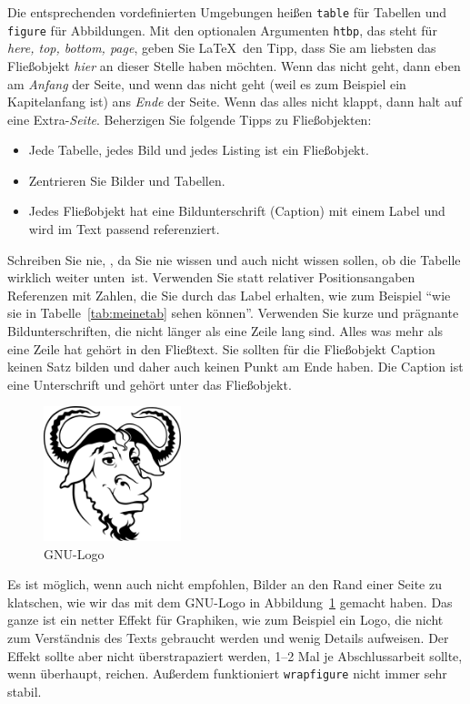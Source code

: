 \documentclass[11pt,a4paper]{report}
\begin{document}
Die entsprechenden vordefinierten Umgebungen heißen 
\verb|table| für Tabellen und \verb|figure| für Abbildungen. 
Mit den optionalen Argumenten \verb|htbp|, das steht für
\textit{here, top, bottom, page}, geben Sie \LaTeX\ den 
Tipp, dass Sie am liebsten das Fließobjekt \textit{hier}
an dieser Stelle haben möchten. Wenn das nicht geht, dann
eben am \textit{Anfang} der Seite, und wenn das nicht geht (weil es
zum Beispiel ein Kapitelanfang ist) ans \textit{Ende} der Seite. 
Wenn das alles nicht klappt, dann halt auf eine Extra-\textit{Seite}.
Beherzigen Sie folgende Tipps zu Fließobjekten:
\begin{itemize}
\item Jede Tabelle, jedes Bild und jedes Listing ist ein Fließobjekt.
\item Zentrieren Sie Bilder und Tabellen.
\item Jedes Fließobjekt hat eine Bildunterschrift (Caption) mit
  einem Label und wird im Text passend referenziert.
\end{itemize}
Schreiben Sie nie, ,
da Sie nie wissen und auch nicht wissen sollen, ob die Tabelle 
wirklich \glqq weiter unten\grqq\ ist. 
Verwenden Sie statt relativer Positionsangaben Referenzen mit Zahlen,
die Sie durch das Label erhalten, wie zum Beispiel 
"`wie sie in Tabelle~\ref{tab:meinetab} sehen können"'.
Verwenden Sie kurze und prägnante Bildunterschriften, die 
nicht länger als eine Zeile lang sind. 
Alles was mehr als eine Zeile hat gehört in den Fließtext.
Sie sollten für die Fließobjekt Caption keinen Satz bilden und 
daher auch keinen Punkt am Ende haben.
Die Caption ist eine Unterschrift und gehört unter das Fließobjekt.


\begin{figure}
  \centering
  \includegraphics[width=4cm]{gnu}
  \caption{GNU-Logo~\cite{gnulogo,fal}}
  \label{fig:gnu}
\end{figure}
Es ist möglich, wenn auch nicht empfohlen, 
Bilder an den 
Rand einer Seite zu klatschen, wie wir das mit dem 
GNU-Logo in Abbildung~\ref{fig:gnu} gemacht haben. 
Das ganze ist ein netter Effekt für Graphiken, wie zum Beispiel ein
Logo, die nicht zum Verständnis des Texts gebraucht werden und wenig
Details aufweisen. 
Der Effekt sollte aber nicht überstrapaziert werden, 1--2 Mal 
je Abschlussarbeit sollte, wenn überhaupt, rei\-chen.
Außerdem funktioniert \verb|wrapfigure| nicht immer sehr stabil.
\end{document}
